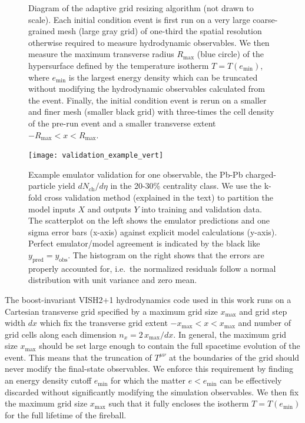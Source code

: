 \documentclass[aps,prc,reprint,amsmath,nofootinbib]{revtex4-1}
\newcommand{\nch}{N_\text{ch}}
\begin{document}
\begin{figure}
  \caption{
    \label{fig:adaptive_grid}
    Diagram of the adaptive grid resizing algorithm (not drawn to scale).
    Each initial condition event is first run on a very large coarse-grained mesh (large gray grid) of one-third the spatial resolution otherwise required to measure hydrodynamic observables.
    We then measure the maximum transverse radius $R_\text{max}$ (blue circle) of the hypersurface defined by the temperature isotherm $T = T(e_\text{min})$, where $e_\text{min}$ is the largest energy density which can be truncated without modifying the hydrodynamic observables calculated from the event.
    Finally, the initial condition event is rerun on a smaller and finer mesh (smaller black grid) with three-times the cell density of the pre-run event and a smaller transverse extent $-R_\text{max} < x < R_\text{max}$.
  }
\end{figure}

\begin{figure}[t]
  \texttt{[image: validation\_example\_vert]}
  \caption{
    \label{fig:validation_example}
    Example emulator validation for one observable, the Pb-Pb charged-particle yield $d\nch/d\eta$ in the 20-30\% centrality class.
    We use the k-fold cross validation method (explained in the text) to partition the model inputs $X$ and outputs $Y$ into training and validation data.
    The scatterplot on the left shows the emulator predictions and one sigma error bars (x-axis) against explicit model calculations (y-axis).
    Perfect emulator/model agreement is indicated by the black like $y_\text{pred}=y_\text{obs}$.
    The histogram on the right shows that the errors are properly accounted for, i.e.\ the normalized residuals follow a normal distribution with unit variance and zero mean.
  }
\end{figure}

The boost-invariant VISH2+1 hydrodynamics code used in this work \cite{Song:2007ux, Shen:2014vra} runs on a Cartesian transverse grid specified by a maximum grid size $x_\text{max}$ and grid step width $dx$ which fix the transverse grid extent ${-x_\text{max} < x < x_\text{max}}$ and number of grid cells along each dimension ${n_x = 2\, x_\text{max} / dx}$.
In general, the maximum grid size $x_\text{max}$ should be set large enough to contain the full spacetime evolution of the event.
This means that the truncation of $T^{\mu\nu}$ at the boundaries of the grid should never modify the final-state observables.
We enforce this requirement by finding an energy density cutoff $e_\text{min}$ for which the matter $e < e_\text{min}$ can be effectively discarded without significantly modifying the simulation observables.
We then fix the maximum grid size $x_\text{max}$ such that it fully encloses the isotherm $T=T(e_\text{min})$ for the full lifetime of the fireball.
\end{document}
